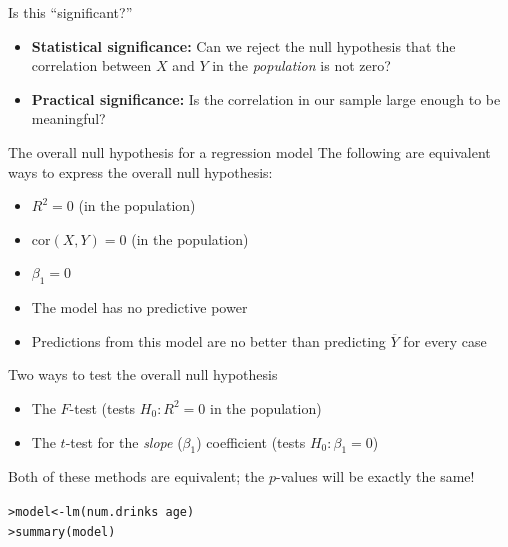\documentclass{beamer}\usepackage[]{graphicx}\usepackage[]{color}
\makeatletter
\newcommand{\hlopt}[1]{\textcolor[rgb]{1,0.894,0.769}{#1}}%
\newcommand{\hlstd}[1]{\textcolor[rgb]{1,0.894,0.769}{#1}}%
\newcommand{\hlkwb}[1]{\textcolor[rgb]{0.804,0.776,0.451}{#1}}%
\newcommand{\hlkwd}[1]{\textcolor[rgb]{1,0.78,0.769}{#1}}%
\newenvironment{kframe}{%
 \def\at@end@of@kframe{}%
 \ifinner\ifhmode%
  \def\at@end@of@kframe{\end{minipage}}%
  \begin{minipage}{\columnwidth}%
 \fi\fi%
 \def\FrameCommand##1{\hskip\@totalleftmargin \hskip-\fboxsep
 \colorbox{shadecolor}{##1}\hskip-\fboxsep
     \hskip-\linewidth \hskip-\@totalleftmargin \hskip\columnwidth}%
 \MakeFramed {\advance\hsize-\width
   \@totalleftmargin\z@ \linewidth\hsize
   \@setminipage}}%
 {\par\unskip\endMakeFramed%
 \at@end@of@kframe}
\newenvironment{knitrout}{}{} %
\makeatother
\begin{document}
\begin{darkframes}
\begin{frame}
      Is this ``significant?''
      \pause
      \begin{itemize}[<+->]
        \item \textbf{Statistical significance:} Can we reject the null hypothesis that the correlation between $X$ and $Y$ in the \emph{population} is not zero?
        \item \textbf{Practical significance:} Is the correlation in our sample large enough to be meaningful?
      \end{itemize}
    \end{frame}

    \begin{frame}{The overall null hypothesis for a regression model}
      The following are equivalent ways to express the overall null hypothesis:
      \begin{itemize}[<+->]
        \item $R^2=0$ (in the population)
        \item $\text{cor}(X,Y)=0$ (in the population)
        \item $\beta_1=0$
        \item The model has no predictive power
        \item Predictions from this model are no better than predicting $\overline Y$ for every case
      \end{itemize}
    \end{frame}

    \begin{frame}{Two ways to test the overall null hypothesis}
      \begin{itemize}
        \item The $F$-test (tests $H_0:R^2=0$ in the population)
        \item The $t$-test for the \emph{slope} ($\beta_1$) coefficient (tests $H_0:\beta_1=0$)
      \end{itemize}
      \pause
      Both of these methods are equivalent; the $p$-values will be exactly the same!
    \end{frame}

    \begin{frame}[fragile]
      \fontsize{9}{9}\selectfont
\begin{knitrout}
\begin{kframe}
\begin{alltt}
\hlstd{> }\hlstd{model} \hlkwb{<-} \hlkwd{lm}\hlstd{(num.drinks} \hlopt{~} \hlstd{age)}
\hlstd{> }\hlkwd{summary}\hlstd{(model)}
\end{alltt}
\begin{verbatim}


\end{verbatim}
\end{kframe}
\end{knitrout}
\end{frame}
\end{darkframes}
\end{document}
